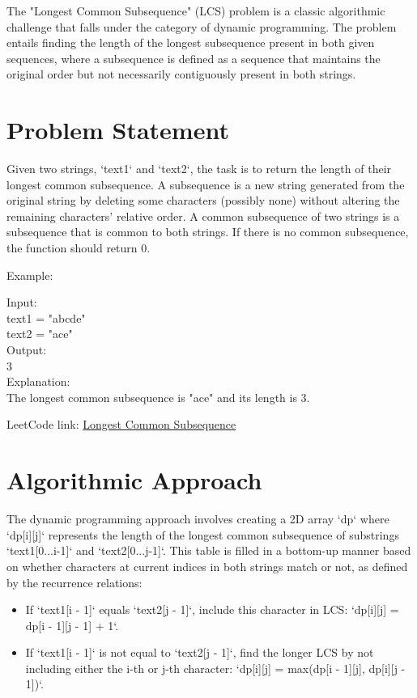 
\label{problem:longest_common_subsequence}
The "Longest Common Subsequence" (LCS) problem is a classic algorithmic challenge that falls under the category of dynamic programming. The problem entails finding the length of the longest subsequence present in both given sequences, where a subsequence is defined as a sequence that maintains the original order but not necessarily contiguously present in both strings.

\section*{Problem Statement}
Given two strings, `text1` and `text2`, the task is to return the length of their longest common subsequence. A subsequence is a new string generated from the original string by deleting some characters (possibly none) without altering the remaining characters' relative order. A common subsequence of two strings is a subsequence that is common to both strings. If there is no common subsequence, the function should return 0.

Example:

Input: \\
text1 = "abcde" \\
text2 = "ace" \\

Output: \\
3  \\

Explanation: \\
The longest common subsequence is "ace" and its length is 3.

LeetCode link: \href{https://leetcode.com/problems/longest-common-subsequence/}{Longest Common Subsequence}

\section*{Algorithmic Approach}
The dynamic programming approach involves creating a 2D array `dp` where `dp[i][j]` represents the length of the longest common subsequence of substrings `text1[0...i-1]` and `text2[0...j-1]`. This table is filled in a bottom-up manner based on whether characters at current indices in both strings match or not, as defined by the recurrence relations:
\begin{itemize}
	\item If `text1[i - 1]` equals `text2[j - 1]`, include this character in LCS: `dp[i][j] = dp[i - 1][j - 1] + 1`.
	\item If `text1[i - 1]` is not equal to `text2[j - 1]`, find the longer LCS by not including either the i-th or j-th character: `dp[i][j] = max(dp[i - 1][j], dp[i][j - 1])`.
\end{itemize}

